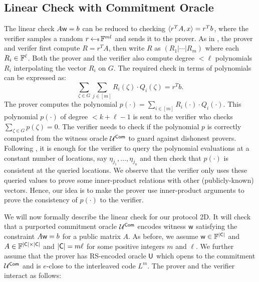 \subsection{Linear Check with Commitment Oracle}\label{subsec:lincheck2D}
The linear check $A\mathsf{w}=b$ can be reduced to checking $\langle r^TA,x\rangle=r^Tb$, where the verifier samples a random $r\hskip2.3pt{\gets\!\!\mbox{\tiny${\$}$\normalsize}}\, \mathbb{F}^{ml}$ and sends it to the prover. As in \cite{ligero}, the prover and verifer first compute $R=r^TA$, then write $R$ as $(R_{1}|\cdots|R_{m})$ where each $R_i\in \mathbb{F}^\ell$. Both the prover and the verifier also compute degree $<\ell$ polynomials $R_{i}$ interpolating the vector $R_{i}$ on $G$. The required check in terms of polynomials can be expressed as:
\begin{equation}\label{eq:lincheck2D}
\sum_{\zeta\in G}\sum_{j\in [m]}
R_{i}(\zeta) \cdot Q_{i}(\zeta) = r^Tb.
\end{equation}
The prover computes the polynomial $p(\cdot)=\sum_{i\in[m]}R_i(\cdot) \cdot Q_i(\cdot)$. This polynomial $p(\cdot)$ of degree $< k+\ell-1$ is sent to the verifier who checks $\sum_{\zeta\in G}p(\zeta)=0$. The verifier needs to check if the polynomial $p$ is correctly computed from the witness oracle $\mathcal{U}^{\mathsf{Com}}$ to guard against dishonest provers. Following \cite{ligero}, it is enough for the verifier to query the polynomial evaluations at a constant number of locations, say $\eta_{j_1},\ldots,\eta_{j_u}$ and then check that $p(\cdot)$ is consistent at the queried locations. We observe that the verifier only uses these queried values to prove some inner-product relations with other (publicly-known) vectors. Hence, our idea is to make the prover use inner-product arguments to prove the consistency of $p(\cdot)$ to the verifier.

We will now formally describe the linear check for our protocol \name2D{}. It will check that a purported commitment oracle $\mathcal{U}^{\mathsf{Com}}$ encodes witness $\mathsf{w}$ satisfying the constraint $A\mathsf{w}=b$ for a public matrix $A$. As before, we assume $\mathsf{w} \in \mathbb{F}^{\mathsf{|C|}}$ and $A\in \mathbb{F}^{\mathsf{|C|}\times \mathsf{|C|}}$ and
$\mathsf{|C|} = m \ell$ for some positive integers $m$ and $\ell$. We further assume that the prover has RS-encoded oracle $\mathsf{U}$ which opens to the commitment $\mathcal{U}^{\mathsf{Com}}$ and is $e$-close to the interleaved code $L^{m}$. The prover and the verifier interact as follows: 

